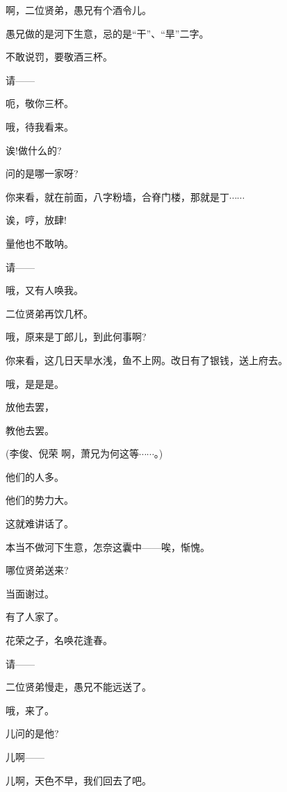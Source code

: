 {{啊，二位贤弟，愚兄有个酒令儿。}

愚兄做的是河下生意，忌的是``干''、``旱''二字。

不敢说罚，要敬酒三杯。

请------\hspace{20pt}~

呃，敬你三杯。

哦，待我看来。

诶!做什么的?

问的是哪一家呀?

你来看，就在前面，八字粉墙，合脊门楼，那就是丁$\cdots{}\cdots{}$

诶，哼，放肆!

量他也不敢呐。

请------\hspace{20pt}~

哦，又有人唤我。

二位贤弟再饮几杯。

哦，原来是丁郎儿，到此何事啊?

你来看，这几日天旱水浅，鱼不上网。改日有了银钱，送上府去。

哦，是是是。

放他去罢，

教他去罢。

(李俊、倪荣 啊，萧兄为何这等$\cdots{}\cdots{}$。)

他们的人多。

他们的势力大。

这就难讲话了。

本当不做河下生意，怎奈这囊中------唉，惭愧。

哪位贤弟送来?

当面谢过。

有了人家了。

花荣之子，名唤花逢春。

请------\hspace{20pt}~

二位贤弟慢走，愚兄不能远送了。

哦，来了。

儿问的是他?

儿啊------\hspace{10pt}~



{儿啊，天色不早，我们回去了吧。}

}

